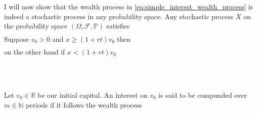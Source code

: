 \documentclass{beamer}
\numberwithin{equation}{section}
\begin{document}
\begin{frame}\frametitle{{\normalsize \secname} \\ {\large \subsecname}}
    I will now show that the wealth process in \eqref{eq:simple_interest_wealth_process} is indeed a stochastic process in any probability space.
    Any stochastic process $X$ on the probability space $(\Omega, \mathscr{F}, \mathbb{P})$ satisfies
    \begin{align}
    \end{align}
    Suppose $v_0 > 0$ and $x \geq (1 + rt)v_0$ then
    \begin{align}
    \end{align}
    on the other hand if $x < (1 + rt)v_0$
    \begin{align}
    \end{align}
\end{frame}

\begin{frame}\frametitle{{\normalsize \secname} \\ {\large \subsecname}}
    \begin{definition}
        Let $v_0 \in \mathbb{R}$ be our initial capital.
        An interest on $v_0$ is said to be compunded over $m\in\mathbb{N}$ periods if it follows the wealth process
        \begin{align}\label{eq:compund_interest_wealth_process}
        \end{align}
    \end{definition}
\end{frame}
\end{document}
